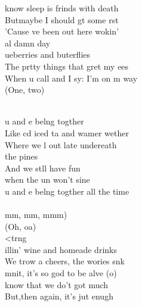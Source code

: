 \begin{cancion}%
	know sleep is frinds with death\\
	Butmaybe I should gt some rst\\
	'Cause ve been out here wokin' \\
	al damn day   \\
	ueberries and buterflies\\
	The prtty things that gret my ees\\
	When u call and I sy: I'm on m way\\
(One, two)\\\jump\\
	\begin{chorus}%
	u and e belng togther\\
	Like cd iced ta and wamer wether\\
	Where we l out late undereath \\
the pines\\
	And we stll have fun \\
	when the un won't sine\\
	u and e belng togther all the time\\
\jump\\
	mm, mm, mmm)\\
	(Oh, oa)\\
	<trng\\
	illin' wine and homeade drinks\\
	We trow a cheers, the wories snk\\
	mnit, it's so god to be alve (o)\\
	 know that we do't got much\\
	But,then again, it's jut enugh\\

\end{chorus}
\end{cancion}
